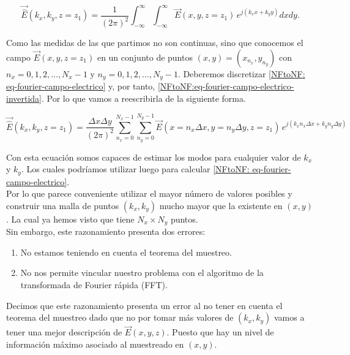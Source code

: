 \documentclass{article}
\begin{document}
\begin{equation}
\vec{\hat{E}}(k_{x},k_{y},z=z_{1})=\frac{1}{(2\pi)^{2}}\int_{-\infty}^{\infty}\int_{-\infty}^{\infty}\vec{E}(x,y,z=z_{1})
\,e^{j (k_{x} x+k_{y} y)} dx dy.
\label{NFtoNF:eq-fourier-campo-electrico-invertida}
\end{equation}

Como las medidas de las que partimos no son continuas, sino que conocemos
el campo $\vec{E}(x,y,z=z_{1})$ en un conjunto de puntos
$(x,y)=(x_{n_{x}},y_{n_{y}})$ con $n_{x}=0,1,2,\ldots,N_{x}-1$ y
$n_{y}=0,1,2,\ldots,N_{y}-1$. Deberemos discretizar \eqref{NFtoNF: eq-fourier-campo-electrico} y, por tanto,  \eqref{NFtoNF:eq-fourier-campo-electrico-invertida}. Por lo que vamos a reescribirla de la siguiente forma.

\begin{equation}
\vec{\hat{E}}(k_{x},k_{y},z=z_{1})=\frac{\Delta x
\Delta y}{(2\pi)^{2}}
\sum_{n_{x}=0}^{N_{x}-1}\sum_{n_{y}=0}^{N_{y}-1}\vec{E}(x=n_{x}\Delta
x,y=n_{y} \Delta y,z=z_{1}) \,e^{j (k_{x} n_{x} \Delta x+k_{y} n_{y}
\Delta y)}
\label{NFtoNF:eq-fourier-campo-electrico-invertida-discretizada}
\end{equation}

Con esta ecuación somos capaces de estimar los modos para
cualquier valor de $k_{x}$ y $k_{y}$. Los cuales podríamos utilizar
luego para calcular  \eqref{NFtoNF: eq-fourier-campo-electrico}.\\
Por lo que parece conveniente utilizar el mayor número de valores posibles y construir
una malla de puntos $(k_{x},k_{y})$ mucho mayor que la existente en $(x,y)$. La cual ya hemos visto que tiene $N_{x}\times N_{y}$ puntos. 
\\

Sin embargo, este razonamiento presenta dos errores:
\begin{enumerate}
    \item No estamos teniendo en cuenta el teorema del muestreo.
    
    \item No nos permite vincular nuestro problema con el algoritmo de la transformada de Fourier rápida (FFT). 

\end{enumerate}

Decimos que este razonamiento presenta un error al no tener en cuenta el teorema del muestreo dado que no por
tomar más valores de $(k_{x},k_{y})$ vamos a tener una mejor descripción
de $\vec{E}(x,y,z)$. Puesto que hay un nivel de información máximo
asociado al muestreado en $(x,y)$.\\
\end{document}
